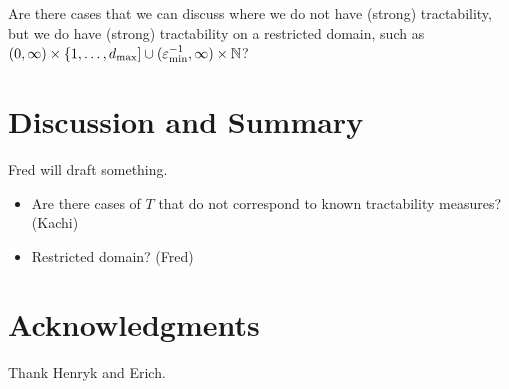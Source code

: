 \documentclass[sort&compress]{elsarticle}
\newcommand{\fred}[1]{\begingroup\color{blue}#1\endgroup}
\begin{document}
\fred{Are there cases that we can discuss where we do not have (strong) tractability, but we do have (strong) tractability on a restricted domain, such as $(0,\infty) \times \{1, \ldots, d_{\max}] \cup (\varepsilon_{\min}^{-1},\infty) \times \mathbb{N}$?}




\section{Discussion and Summary}

\fred{Fred will draft something.
\begin{itemize}
\item Are there cases of $T$ that do not correspond to known tractability measures? (Kachi)
\item Restricted domain? (Fred)
\end{itemize}}

\section{Acknowledgments}
Thank Henryk and Erich.



\end{document}
